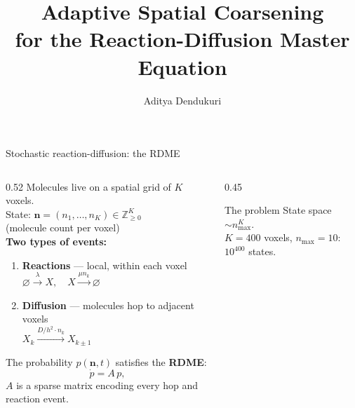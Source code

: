 \documentclass[10pt,aspectratio=169]{beamer}
\title[Adaptive 2D Coarsening for RDME FSP]{%
  Adaptive Spatial Coarsening\\
  for the Reaction-Diffusion Master Equation}
\author{Aditya Dendukuri}
\institute[UCSB]{University of California, Santa Barbara}
\date{}
\begin{document}
\begin{frame}\titlepage\end{frame}

\begin{frame}{Stochastic reaction-diffusion: the RDME}

\begin{columns}[T]
\begin{column}{0.52\textwidth}
  Molecules live on a spatial grid of $K$ voxels.\\[0.5em]
  State: $\mathbf{n} = (n_1,\ldots,n_K)\in\mathbb{Z}_{\ge 0}^K$\\
  (molecule count per voxel)\\[0.8em]

  \textbf{Two types of events:}
  \begin{enumerate}
    \item \textbf{Reactions} — local, within each voxel\\
          $\varnothing \xrightarrow{\lambda} X,\quad X \xrightarrow{\mu n_k} \varnothing$
    \item \textbf{Diffusion} — molecules hop to adjacent voxels\\
          $X_k \xrightarrow{D/h^2\cdot n_k} X_{k\pm 1}$
  \end{enumerate}

  \bigskip
  The probability $p(\mathbf{n},t)$ satisfies the \textbf{RDME}:
  \[
    \dot{p} = A\,p,
  \]
  $A$ is a sparse matrix encoding every hop and reaction event.
\end{column}
\begin{column}{0.45\textwidth}
  \centering

  \bigskip
  \begin{alertblock}{The problem}
    State space $\sim n_{\max}^K$.\\
    $K=400$ voxels, $n_{\max}=10$: $10^{400}$ states.
  \end{alertblock}
\end{column}
\end{columns}
\end{frame}
\end{document}
